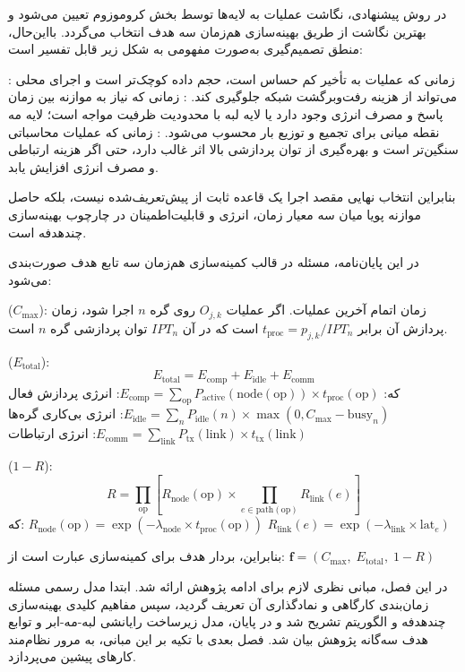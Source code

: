 
در روش پیشنهادی، نگاشت عملیات به لایه‌ها توسط بخش  کروموزوم تعیین می‌شود
و بهترین نگاشت از طریق بهینه‌سازی هم‌زمان سه هدف انتخاب می‌گردد. بااین‌حال، منطق تصمیم‌گیری
به‌صورت مفهومی به شکل زیر قابل تفسیر است:

 : زمانی که عملیات به تأخیر کم حساس است، حجم داده کوچک‌تر است
و اجرای محلی می‌تواند از هزینه رفت‌وبرگشت شبکه جلوگیری کند.
 : زمانی که نیاز به موازنه بین زمان پاسخ و مصرف انرژی وجود دارد
یا لایه لبه با محدودیت ظرفیت مواجه است؛ لایه مه نقطه میانی برای تجمیع و توزیع بار محسوب می‌شود.
 : زمانی که عملیات محاسباتی سنگین‌تر است و بهره‌گیری از توان پردازشی بالا
اثر غالب دارد، حتی اگر هزینه ارتباطی و مصرف انرژی افزایش یابد.

بنابراین انتخاب نهایی مقصد اجرا یک قاعده ثابت از پیش‌تعریف‌شده نیست، بلکه حاصل موازنه پویا
میان سه معیار زمان، انرژی و قابلیت‌اطمینان در چارچوب بهینه‌سازی چندهدفه است.



در این پایان‌نامه، مسئله در قالب کمینه‌سازی هم‌زمان سه تابع هدف صورت‌بندی می‌شود:

 ($C_{\max}$):
زمان اتمام آخرین عملیات.
اگر عملیات $O_{j,k}$ روی گره $n$ اجرا شود، زمان پردازش آن برابر $t_{\text{proc}} = p_{j,k} / IPT_n$ است که در آن $IPT_n$ توان پردازشی گره $n$ است.

 ($E_{\text{total}}$):
\begin{equation}
E_{\text{total}} = E_{\text{comp}} + E_{\text{idle}} + E_{\text{comm}}
\end{equation}
که:
 $E_{\text{comp}} = \sum_{\text{op}} P_{\text{active}}(\text{node}(\text{op})) \times t_{\text{proc}}(\text{op})$:
انرژی پردازش فعال
 $E_{\text{idle}} = \sum_{n} P_{\text{idle}}(n) \times \max(0, C_{\max} - \text{busy}_n)$:
انرژی بی‌کاری گره‌ها
 $E_{\text{comm}} = \sum_{\text{link}} P_{\text{tx}}(\text{link}) \times t_{\text{tx}}(\text{link})$:
انرژی ارتباطات

 ($1 - R$):
\begin{equation}
R = \prod_{\text{op}} \left[ R_{\text{node}}(\text{op}) \times \prod_{e \in \text{path}(\text{op})} R_{\text{link}}(e) \right]
\end{equation}
که:
 $R_{\text{node}}(\text{op}) = \exp(-\lambda_{\text{node}} \times t_{\text{proc}}(\text{op}))$
 $R_{\text{link}}(e) = \exp(-\lambda_{\text{link}} \times \text{lat}_e)$

بنابراین، بردار هدف برای کمینه‌سازی عبارت است از:
$\mathbf{f} = (C_{\max}, \; E_{\text{total}}, \; 1 - R)$



در این فصل، مبانی نظری لازم برای ادامه پژوهش ارائه شد.
ابتدا مدل رسمی مسئله زمان‌بندی کارگاهی و نمادگذاری آن تعریف گردید،
سپس مفاهیم کلیدی بهینه‌سازی چندهدفه و الگوریتم  تشریح شد
و در پایان، مدل زیرساخت رایانشی لبه-مه-ابر و توابع هدف سه‌گانه پژوهش بیان شد.
فصل بعدی با تکیه بر این مبانی، به مرور نظام‌مند کارهای پیشین می‌پردازد.
